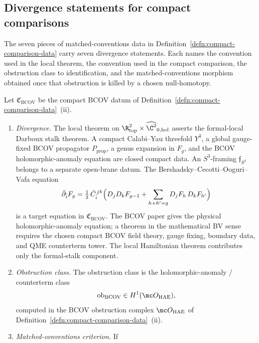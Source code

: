 \subsection*{Divergence statements for compact comparisons}

The seven pieces of matched-conventions data in
Definition~\ref{defn:compact-comparison-data} carry seven
divergence statements.  Each names the convention used in the local
theorem, the convention used in the compact comparison, the
obstruction class to identification, and the matched-conventions
morphism obtained once that obstruction is killed by a chosen
null-homotopy.

\begin{thm}\label{thm:divergence-bcov}
  Let \(\mathfrak C_{\mathrm{BCOV}}\) be the compact BCOV datum of
  Definition~\ref{defn:compact-comparison-data}~(ii).
  \begin{enumerate}[label=(\roman*)]
    \item \emph{Divergence.}  The local theorem on
      \(\R^2_{\mathrm{top}}\times\widehat{\C^2}_{0,\mathrm{hol}}\)
      asserts the formal-local Darboux stalk theorem.  A compact
	      Calabi--Yau threefold \(Y^3\), a global gauge-fixed BCOV propagator
	      \(P_{\mathrm{prop}}\), a genus expansion in \(F_g\), and the BCOV
	      holomorphic-anomaly equation are closed compact data.  An
	      \(S^3\)-framing \(\mathfrak f_{S^3}\) belongs to a separate
	      open-brane datum.  The
      Bershadsky--Cecotti--Ooguri--Vafa equation
      \[
        \bar\partial_{\bar i}F_g
        =\tfrac12\,\bar C_{\bar i}^{\,jk}
          \Bigl(D_jD_kF_{g-1}
            +\sum_{h+h'=g}D_jF_h\,D_kF_{h'}\Bigr)
      \]
	      is a target equation in \(\mathfrak C_{\mathrm{BCOV}}\).  The
	      BCOV paper gives the physical holomorphic-anomaly equation; a
	      theorem in the mathematical BV sense requires the chosen compact
		      BCOV field theory, gauge fixing, boundary data, and QME
              counterterm tower.
	      The local Hamiltonian theorem contributes only the formal-stalk
	      component.
    \item \emph{Obstruction class.}  The obstruction class is
      the holomorphic-anomaly / counterterm class
      \[
        \operatorname{ob}_{\mathrm{BCOV}}
          \in
          H^1(\mc O_{\mathrm{HAE}}),
      \]
      computed in the BCOV obstruction complex
      \(\mc O_{\mathrm{HAE}}\) of
      Definition~\ref{defn:compact-comparison-data}~(ii).
    \item \emph{Matched-conventions criterion.}  If

\end{enumerate}
\end{thm}
